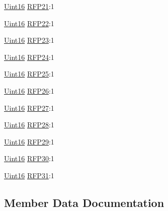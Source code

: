 \begin{DoxyCompactItemize}
\hyperlink{_d_s_p2833x___device_8h_a59a9f6be4562c327cbfb4f7e8e18f08b}{Uint16} \hyperlink{struct_c_a_n_r_f_p___b_i_t_s_a7489950ba3dc5e87885ba0770676fc63}{R\+F\+P21}\+:1
\item 
\hyperlink{_d_s_p2833x___device_8h_a59a9f6be4562c327cbfb4f7e8e18f08b}{Uint16} \hyperlink{struct_c_a_n_r_f_p___b_i_t_s_a740d2110459322f864d3d061be410104}{R\+F\+P22}\+:1
\item 
\hyperlink{_d_s_p2833x___device_8h_a59a9f6be4562c327cbfb4f7e8e18f08b}{Uint16} \hyperlink{struct_c_a_n_r_f_p___b_i_t_s_ac3ee31d6cd0bc3f4929058bd5ac649ec}{R\+F\+P23}\+:1
\item 
\hyperlink{_d_s_p2833x___device_8h_a59a9f6be4562c327cbfb4f7e8e18f08b}{Uint16} \hyperlink{struct_c_a_n_r_f_p___b_i_t_s_abababf39b92a4e2ec04875053bcb5c61}{R\+F\+P24}\+:1
\item 
\hyperlink{_d_s_p2833x___device_8h_a59a9f6be4562c327cbfb4f7e8e18f08b}{Uint16} \hyperlink{struct_c_a_n_r_f_p___b_i_t_s_a9f1b2f24d5d8390d4966646c622ee474}{R\+F\+P25}\+:1
\item 
\hyperlink{_d_s_p2833x___device_8h_a59a9f6be4562c327cbfb4f7e8e18f08b}{Uint16} \hyperlink{struct_c_a_n_r_f_p___b_i_t_s_a4c68eb392cc1d61aabbfd8bc35bebea0}{R\+F\+P26}\+:1
\item 
\hyperlink{_d_s_p2833x___device_8h_a59a9f6be4562c327cbfb4f7e8e18f08b}{Uint16} \hyperlink{struct_c_a_n_r_f_p___b_i_t_s_a761b27b4ae497af420e2e1fea0330eb5}{R\+F\+P27}\+:1
\item 
\hyperlink{_d_s_p2833x___device_8h_a59a9f6be4562c327cbfb4f7e8e18f08b}{Uint16} \hyperlink{struct_c_a_n_r_f_p___b_i_t_s_af5dd6fa11f0f724c42bcdcba6d4dc3ac}{R\+F\+P28}\+:1
\item 
\hyperlink{_d_s_p2833x___device_8h_a59a9f6be4562c327cbfb4f7e8e18f08b}{Uint16} \hyperlink{struct_c_a_n_r_f_p___b_i_t_s_acfaa5c6a938b004f63af3572683365f0}{R\+F\+P29}\+:1
\item 
\hyperlink{_d_s_p2833x___device_8h_a59a9f6be4562c327cbfb4f7e8e18f08b}{Uint16} \hyperlink{struct_c_a_n_r_f_p___b_i_t_s_a3e171f60e9c6261a6e2279ba7a3ab46d}{R\+F\+P30}\+:1
\item 
\hyperlink{_d_s_p2833x___device_8h_a59a9f6be4562c327cbfb4f7e8e18f08b}{Uint16} \hyperlink{struct_c_a_n_r_f_p___b_i_t_s_a21a5b49c257cc45c2e8fc6a3c0978e70}{R\+F\+P31}\+:1
\end{DoxyCompactItemize}


\subsection{Member Data Documentation}
\hypertarget{struct_c_a_n_r_f_p___b_i_t_s_ace73a245bcacb56193ffb410e2d5817b}{}
